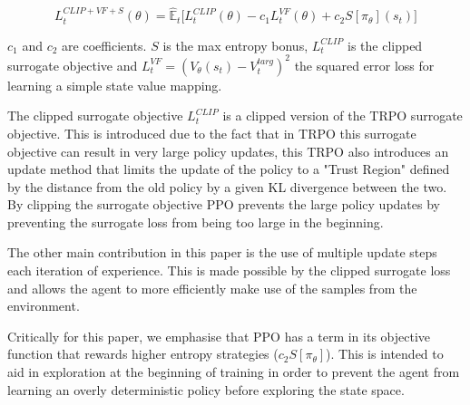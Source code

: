 \documentclass[conference]{IEEEtran}
\newcommand\REVIEW[1]{{\color{blue} #1}}
\begin{document}
\begin{equation}
    L_t^{CLIP+VF+S}(\theta) = \hat{\mathbb{E}}_t\big[L_t^{CLIP}(\theta)-c_1L_t^{VF}(\theta)+c_2S[\pi_{\theta}](s_t)\big]
    \label{eq:ppo-objective}
\end{equation}

$c_1$ and $c_2$ are coefficients. $S$ is the max entropy bonus, $L_t^{CLIP}$ is the clipped surrogate objective and $L_t^{VF} = (V_{\theta}(s_t)-V_t^{targ})^2$ the squared error loss for learning a simple state value mapping.

\REVIEW{
    The clipped surrogate objective $L_t^{CLIP}$ is a clipped version of the TRPO surrogate objective. This is introduced due to the fact that in TRPO this surrogate objective can result in very large policy updates, this TRPO also introduces an update method that limits the update of the policy to a "Trust Region" defined by the distance from the old policy by a given KL divergence between the two. By clipping the surrogate objective PPO prevents the large policy updates by preventing the surrogate loss from being too large in the beginning.

The other main contribution in this paper is the use of multiple update steps each iteration of experience. This is made possible by the clipped surrogate loss and allows the agent to more efficiently make use of the samples from the environment.
}


Critically for this paper, we emphasise that PPO has a term in its objective function that rewards higher entropy strategies ($c_2S[\pi_{\theta}]$). This is intended to aid in exploration at the beginning of training in order to prevent the agent from learning an overly deterministic policy before exploring the state space.
\end{document}
